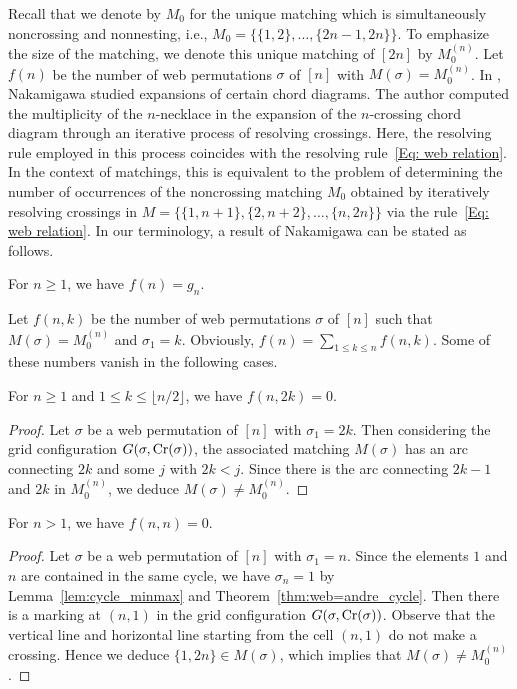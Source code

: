 Recall that we denote by \( M_0 \) for the unique matching which
is simultaneously noncrossing and nonnesting, i.e.,
\( M_0 = \{ \{1,2\},\dots,\{2n-1,2n\} \} \).
To emphasize the size of the matching, we denote this unique matching of $[2n]$
by $M^{(n)}_0$. Let $f(n)$ be the number of web permutations $\sigma$ of $[n]$
with $M(\sigma)=M^{(n)}_0$.
In \cite{Nak20}, Nakamigawa studied expansions of certain chord diagrams.
The author computed the multiplicity of the \( n \)-necklace
in the expansion of the \( n \)-crossing chord diagram through an iterative
process of resolving crossings.
Here, the resolving rule employed in this process coincides with the resolving
rule~\eqref{Eq: web relation}.
In the context of matchings, this is equivalent to the problem of determining
the number of occurrences of the noncrossing matching \( M_0 \) obtained by
iteratively resolving crossings in \( M = \{\{1,n+1\},\{2,n+2\},\dots,\{n,2n\}\}
\) via the rule~\eqref{Eq: web relation}.
In our terminology, a result of Nakamigawa can be stated as follows.

\begin{thm} \label{thm:Geno}
  For \( n\ge 1 \), we have \( f(n)=g_n \).
\end{thm}
Let $f(n,k)$ be the number of web permutations $\sigma$ of $[n]$ such that
\( M(\sigma) = M^{(n)}_0 \) and $\sigma_1=k$.
Obviously, \( f(n)=\sum_{1\le k\le n} f(n,k) \).
Some of these numbers vanish in the following cases.
\begin{prop}\label{prop:web-Genocchi even k=0}
  For $n\ge1$ and $1\le k \le \lfloor n/2\rfloor$, we have $f(n,2k)=0$.  
\end{prop}
\begin{proof}
  Let $\sigma$ be a web permutation of $[n]$ with $\sigma_1=2k$.
  Then considering the grid configuration \( G(\sigma,\operatorname{Cr}(\sigma)) \),
  the associated matching $M(\sigma)$ has an arc connecting $2k$
  and some $j$ with $2k<j$. Since there is the arc connecting $2k-1$ and $2k$
  in $M^{(n)}_0$, we deduce $M(\sigma)\neq M^{(n)}_0$.
\end{proof}

\begin{prop}\label{prop:web-Genocchi odd n,n=0}
  For $n>1$, we have $f(n,n)=0$. 
\end{prop}
\begin{proof}
  Let $\sigma$ be a web permutation of $[n]$ with $\sigma_1=n$.
  Since the elements \( 1 \) and \( n \) are contained in the same cycle, we have
  \( \sigma_n = 1 \) by Lemma~\ref{lem:cycle_minmax} and
  Theorem~\ref{thm:web=andre_cycle}. Then there is a marking at $(n,1)$
  in the grid configuration \( G(\sigma,\operatorname{Cr}(\sigma)) \).
  Observe that the vertical line and horizontal line starting from
  the cell $(n,1)$ do not make a crossing.
  Hence we deduce $\{1,2n\}\in M(\sigma)$,
  which implies that $M(\sigma)\neq M^{(n)}_0$.
\end{proof}

